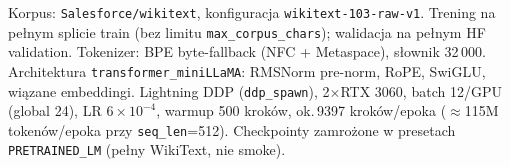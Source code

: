Korpus: \texttt{Salesforce/wikitext}, konfiguracja \texttt{wikitext-103-raw-v1}. Trening na pełnym splicie train (bez limitu \texttt{max\_corpus\_chars}); walidacja na pełnym HF validation. Tokenizer: BPE byte-fallback (NFC + Metaspace), słownik 32\,000. Architektura \texttt{transformer\_miniLLaMA}: RMSNorm pre-norm, RoPE, SwiGLU, wiązane embeddingi. Lightning DDP (\texttt{ddp\_spawn}), 2$\times$RTX 3060, batch 12/GPU (global 24), LR $6\times10^{-4}$, warmup 500 kroków, ok.\,9397 kroków/epoka ($\approx$115M tokenów/epoka przy \texttt{seq\_len}=512). Checkpointy zamrożone w presetach \texttt{PRETRAINED\_LM} (pełny WikiText, nie smoke).
